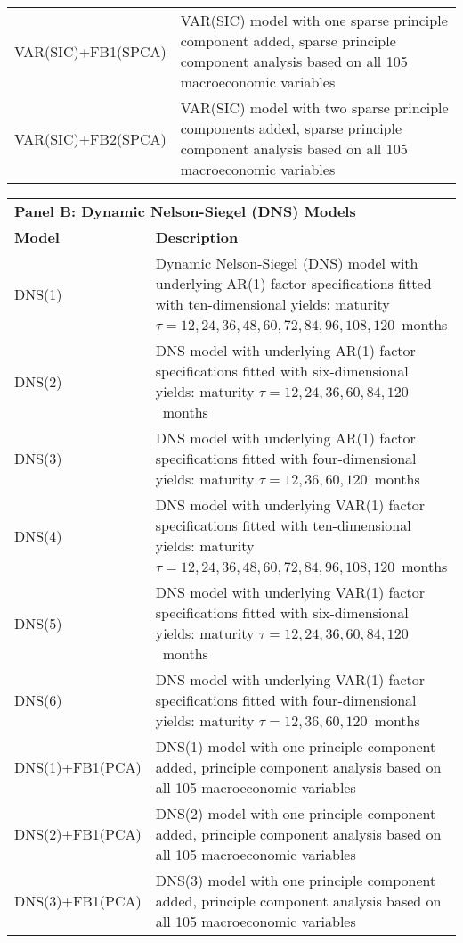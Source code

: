 \begin{footnotesize}
\begin{tabularx}{\linewidth}{lX}
VAR(SIC)+FB1(SPCA)        & VAR(SIC) model with one sparse principle component added, sparse principle component analysis based on all 105 macroeconomic variables \\
VAR(SIC)+FB2(SPCA)        & VAR(SIC) model with two sparse principle components added, sparse principle component analysis based on all 105 macroeconomic variables 
\end{tabularx}
\begin{tabularx}{\linewidth}{lX}
\toprule
\multicolumn{2}{l}{\textbf{Panel B: Dynamic Nelson-Siegel (DNS) Models}} \\
\multicolumn{1}{l}{\textbf{Model}} & \multicolumn{1}{l}{\textbf{Description}} \\ \midrule
\endhead
\bottomrule
\endfoot
DNS(1)                    & Dynamic Nelson-Siegel (DNS) model with underlying AR(1) factor specifications fitted with ten-dimensional yields: maturity $\tau = 12, 24, 36, 48, 60, 72, 84, 96, 108, 120$\ months \\
DNS(2)                    & DNS model with underlying AR(1) factor specifications fitted with six-dimensional yields: maturity $\tau = 12, 24, 36, 60, 84, 120$\ months  \\
DNS(3)                    & DNS model with underlying AR(1) factor specifications fitted with four-dimensional yields: maturity $\tau = 12, 36, 60, 120$\ months         \\
DNS(4)                    & DNS model with underlying VAR(1) factor specifications fitted with ten-dimensional yields: maturity $\tau = 12, 24, 36, 48, 60, 72, 84, 96, 108, 120$\ months \\
DNS(5)                    & DNS model with underlying VAR(1) factor specifications fitted with six-dimensional yields: maturity $\tau = 12, 24, 36, 60, 84, 120$\ months \\
DNS(6)                    & DNS model with underlying VAR(1) factor specifications fitted with four-dimensional yields: maturity $\tau = 12, 36, 60, 120$\ months        \\ 
DNS(1)+FB1(PCA)           & DNS(1) model with one principle component added, principle component analysis based on all 105 macroeconomic variables \\
DNS(2)+FB1(PCA)           & DNS(2) model with one principle component added, principle component analysis based on all 105 macroeconomic variables \\
DNS(3)+FB1(PCA)           & DNS(3) model with one principle component added, principle component analysis based on all 105 macroeconomic variables \\

\end{tabularx}
\end{footnotesize}
